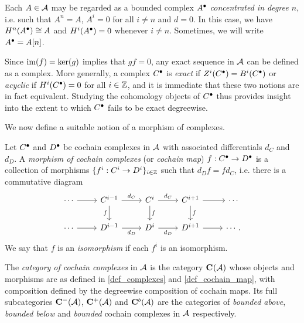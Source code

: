 \begin{example}
  Each $A \in \abcat{A}$ may be regarded as a bounded complex
  $\cochaincomp{A}$ \emph{concentrated in degree $n$}, i.e. such that
  $A^n = A$, $A^i = 0$ for all $i \neq n$ and $d = 0$.
  In this case, we have $H^n(\cochaincomp{A}) \cong A$ and
  $H^i(\cochaincomp{A}) = 0$ whenever $i \neq n$.
  Sometimes, we will write $\cochaincomp{A} = A[n]$.
\end{example}

\begin{example}
  Since $\im(f) = \ker(g)$ implies that $g f = 0$, any exact sequence
  in $\abcat{A}$ can be defined as a complex.
  More generally, a complex $\cochaincomp{C}$ is \emph{exact} if
  $Z^i(\cochaincomp{C}) = B^i(\cochaincomp{C})$ or \emph{acyclic} if
  $H^i(\cochaincomp{C}) = 0$ for all $i \in \bb{Z}$, and it is
  immediate that these two notions are in fact equivalent.
  Studying the cohomology objects of $\cochaincomp{C}$ thus provides
  insight into the extent to which $\cochaincomp{C}$ fails to be
  exact degreewise.
\end{example}

We now define a suitable notion of a morphism of complexes.

\begin{definition}
  \label{def_cochain_map}
  Let $\cochaincomp{C}$ and $\cochaincomp{D}$ be cochain complexes in
  $\abcat{A}$ with associated differentials $d_C$ and $d_D$.
  A \emph{morphism of cochain complexes} (or \emph{cochain map}) $f:
  \cochaincomp{C} \to \cochaincomp{D}$ is a collection of morphisms
  $\{f^i: C^i \to D^i\}_{i \in \bb{Z}}$ such that
  $d_D f = f d_C$, i.e. there is a commutative diagram
  \[
    \begin{tikzcd}
      \cdots \arrow[r]
      & C^{i - 1} \arrow[d, "f"'] \arrow[r, "d_C"]
      & C^i \arrow[d, "f"] \arrow[r, "d_C"]
      & C^{i + 1} \arrow[d, "f"] \arrow[r]
      & \cdots
      \\
      \cdots \arrow[r]
      & D^{i - 1} \arrow[r, "d_D"']
      & D^i \arrow[r, "d_D"']
      & D^{i + 1} \ar[r]
      & \cdots.
    \end{tikzcd}
  \]
  We say that $f$ is an \emph{isomorphism} if each $f^i$ is an isomorphism.
\end{definition}

\begin{definition}
  The \emph{category of cochain complexes} in $\abcat{A}$ is the
  category $\Ch{\abcat{A}}$ whose objects and morphisms are as
  defined in \cref{def_complexes} and \cref{def_cochain_map}, with
  composition defined by the degreewise composition of cochain maps.
  Its full subcategories $\Ch[-]{\abcat{A}}$, $\Ch[+]{\abcat{A}}$ and
  $\Ch[b]{\abcat{A}}$ are the categories of \emph{bounded above},
  \emph{bounded below} and \emph{bounded} cochain complexes in
  $\abcat{A}$ respectively.
\end{definition}

